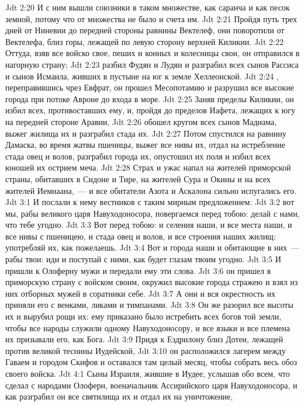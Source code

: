 \vs Jdt 2:20 И с ним вышли союзники в таком множестве, как саранча и как песок земной, потому что от множества не было и счета им.
\vs Jdt 2:21 Пройдя путь трех дней от Ниневии до передней стороны равнины Вектелеф, они поворотили от Вектелефа, близ горы, лежащей по левую сторону верхней Киликии.
\vs Jdt 2:22 Оттуда, взяв все войско свое, пеших и конных и колесницы свои, он отправился в нагорную страну;
\vs Jdt 2:23 разбил Фудян и Лудян и разграбил всех сынов Рассиса и сынов Исмаила, живших в пустыне на юг к земле Хеллеонской.
\vs Jdt 2:24 , переправившись чрез Евфрат, он прошел Месопотамию и разрушил все высокие города при потоке Авроне до входа в море.
\vs Jdt 2:25 Заняв пределы Киликии, он избил всех, противоставших ему, и, пройдя до пределов Иафета, лежащих к югу на передней стороне Аравии,
\vs Jdt 2:26 обошел кругом всех сынов Мадиама, выжег жилища их и разграбил стада их.
\vs Jdt 2:27 Потом спустился на равнину Дамаска, во время жатвы пшеницы, выжег все нивы их, отдал на истребление стада овец и волов, разграбил города их, опустошил их поля и избил всех юношей их острием меча.
\vs Jdt 2:28 Страх и ужас напал на жителей приморской страны, обитавших в Сидоне и Тире, на жителей Сура и Окины и на всех жителей Иемнаана,~--- и все обитатели Азота и Аскалона сильно испугались его.
\vs Jdt 3:1 И послали к нему вестников с таким мирным предложением:
\vs Jdt 3:2 вот мы, рабы великого царя Навуходоносора, повергаемся перед тобою: делай с нами, что тебе угодно.
\vs Jdt 3:3 Вот перед тобою: и селения наши, и все места наши, и все нивы с пшеницею, и стада овец и волов, и все строения наших жилищ: употребляй их, как пожелаешь.
\vs Jdt 3:4 Вот и города наши и обитающие в них~--- рабы твои: иди и поступай с ними, как будет глазам твоим угодно.
\rsbpar\vs Jdt 3:5 И пришли к Олоферну мужи и передали ему эти слова.
\vs Jdt 3:6  он пришел в приморскую страну с войском своим, окружил высокие города стражею и взял из них отборных мужей в соратники себе.
\vs Jdt 3:7 А они и вся окрестность их приняли его с венками, ликами и тимпанами.
\vs Jdt 3:8 Он же разорил все высоты их и вырубил рощи их: ему приказано было истребить всех богов той земли, чтобы все народы служили одному Навуходоносору, и все языки и все племена их призывали его, как Бога.
\vs Jdt 3:9 Придя к Ездрилону близ Дотеи, лежащей против великой теснины Иудейской,
\vs Jdt 3:10 он расположился лагерем между Гаваем и городом Скифов и оставался там целый месяц, чтобы собрать весь обоз своего войска.
\vs Jdt 4:1 Сыны Израиля, жившие в Иудее, услышав обо всем, что сделал с народами Олоферн, военачальник Ассирийского царя Навуходоносора, и как разграбил он все святилища их и отдал их на уничтожение,
